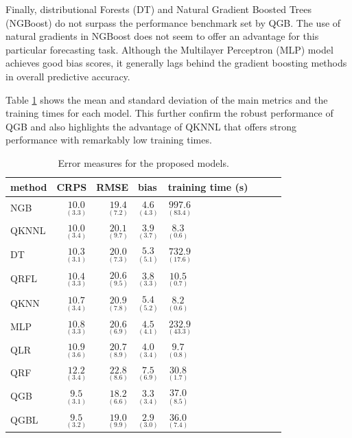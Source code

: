 \documentclass[12pt,a4paper]{book}
\begin{document}
Finally, distributional Forests (DT) and Natural Gradient Boosted Trees (NGBoost) do not surpass the performance benchmark set by QGB. The use of natural gradients in NGBoost does not seem to offer an advantage for this particular forecasting task. Although the Multilayer Perceptron (MLP) model achieves good bias scores, it generally lags behind the gradient boosting methods in overall predictive accuracy.

Table \ref{tab:exp1_determ} shows the mean and standard deviation of the main metrics and the training times for each model. This further confirm the robust performance of QGB and also highlights the advantage of QKNNL that offers strong performance with remarkably low training times.

\begin{table}[tbp]
  \centering \footnotesize
  \caption{\label{tab:exp1_determ}Error measures for the proposed models.}
    \begin{tabular}{lrrlllll}
      \toprule
         method &              CRPS &              RMSE &             bias &                training time (s) \\
        \midrule
            NGB &  $ \underset{(3.3)}{10.0} $ &  $ \underset{(7.2)}{19.4} $ &  $ \underset{(4.3)} {4.6}$ & $ \underset{(83.4)}  {997.6}$    \\
          QKNNL &  $ \underset{(3.4)}{10.0} $ &  $ \underset{(9.7)}{20.1} $ &  $ \underset{(3.7)} {3.9}$ & $ \underset{(0.6)}     {8.3}$    \\
             DT &  $ \underset{(3.1)}{10.3} $ &  $ \underset{(7.3)}{20.0} $ &  $ \underset{(5.1)} {5.3}$ & $ \underset{(17.6)}  {732.9}$   \\
           QRFL &  $ \underset{(3.3)}{10.4} $ &  $ \underset{(9.5)}{20.6} $ &  $ \underset{(3.3)} {3.8}$ & $ \underset{(0.7)}    {10.5}$    \\
           QKNN &  $ \underset{(3.4)}{10.7} $ &  $ \underset{(7.8)}{20.9} $ &  $ \underset{(5.2)} {5.4}$ & $ \underset{(0.6)}     {8.2}$   \\
            MLP &  $ \underset{(3.3)}{10.8} $ &  $ \underset{(6.9)}{20.6} $ &  $ \underset{(4.1)} {4.5}$ & $ \underset{(43.3)}  {232.9}$   \\
            QLR &  $ \underset{(3.6)}{10.9} $ &  $ \underset{(8.9)}{20.7} $ &  $ \underset{(3.4)} {4.0}$ & $ \underset{(0.8)}     {9.7}$    \\
            QRF &  $ \underset{(3.4)}{12.2} $ &  $ \underset{(8.6)}{22.8} $ &  $ \underset{(6.9)} {7.5}$ & $ \underset{(1.7)}    {30.8}$    \\
            QGB &  $ \underset{(3.1)}{9.5}  $ &  $ \underset{(6.6)}{18.2} $ &  $ \underset{(3.4)} {3.3}$ & $ \underset{(8.5)}    {37.0}$    \\
           QGBL &  $ \underset{(3.2)}{9.5}  $ &  $ \underset{(9.9)}{19.0} $ &  $ \underset{(3.0)} {2.9}$ & $ \underset{(7.4)}    {36.0}$   \\
       \bottomrule
      \end{tabular}
\end{table}
\end{document}
